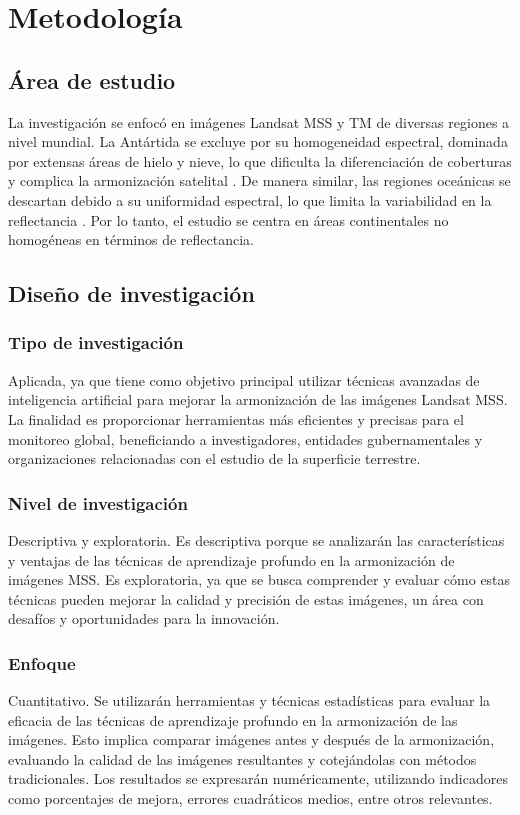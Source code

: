 \Chapter{}
\chapter{Metodología}
    \section{Área de estudio}
        La investigación se enfocó en imágenes Landsat MSS y TM de diversas regiones a nivel mundial. La Antártida se excluye por su homogeneidad espectral, dominada por extensas áreas de hielo y nieve, lo que dificulta la diferenciación de coberturas y complica la armonización satelital \autocite{kokhanovsky2019retrieval}. De manera similar, las regiones oceánicas se descartan debido a su uniformidad espectral, lo que limita la variabilidad en la reflectancia \autocite{estrella2021spectral}. Por lo tanto, el estudio se centra en áreas continentales no homogéneas en términos de reflectancia.
    \section{Diseño de investigación}
        \subsection{Tipo de investigación}
            Aplicada, ya que tiene como objetivo principal utilizar técnicas avanzadas de inteligencia artificial para mejorar la armonización de las imágenes Landsat MSS. La finalidad es proporcionar herramientas más eficientes y precisas para el monitoreo global, beneficiando a investigadores, entidades gubernamentales y organizaciones relacionadas con el estudio de la superficie terrestre.
        \subsection{Nivel de investigación}
            Descriptiva y exploratoria. Es descriptiva porque se analizarán las características y ventajas de las técnicas de aprendizaje profundo en la armonización de imágenes MSS. Es exploratoria, ya que se busca comprender y evaluar cómo estas técnicas pueden mejorar la calidad y precisión de estas imágenes, un área con desafíos y oportunidades para la innovación.
	\subsection{Enfoque}
            Cuantitativo. Se utilizarán herramientas y técnicas estadísticas para evaluar la eficacia de las técnicas de aprendizaje profundo en la armonización de las imágenes. Esto implica comparar imágenes antes y después de la armonización, evaluando la calidad de las imágenes resultantes y cotejándolas con métodos tradicionales. Los resultados se expresarán numéricamente, utilizando indicadores como porcentajes de mejora, errores cuadráticos medios, entre otros relevantes.


